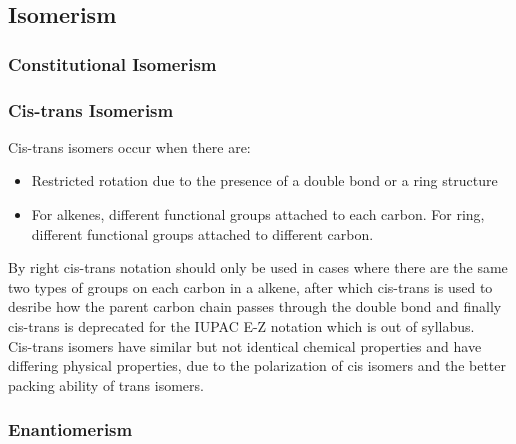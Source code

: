 \documentclass[../main]{subfiles}
\begin{document}
	\subsection{Isomerism}

	\subsubsection{Constitutional Isomerism}


	\subsubsection{Cis-trans Isomerism}


	Cis-trans isomers occur when there are:

	\begin{itemize}
		\item Restricted rotation due to the presence of a  double bond or a ring structure
		\item For alkenes, different functional groups attached to each carbon. For ring, different functional groups attached to different carbon.
	\end{itemize}

	By right cis-trans notation should only be used in cases where there are the same two types of groups on each carbon in a alkene, after which cis-trans is used to desribe how the parent carbon chain passes through the double bond and finally cis-trans is deprecated for the IUPAC E-Z notation which is out of syllabus. \\

	Cis-trans isomers have similar but not identical chemical properties and have differing physical properties, due to the polarization of cis isomers and the better packing ability of trans isomers.

	\subsubsection{Enantiomerism}

\end{document}
